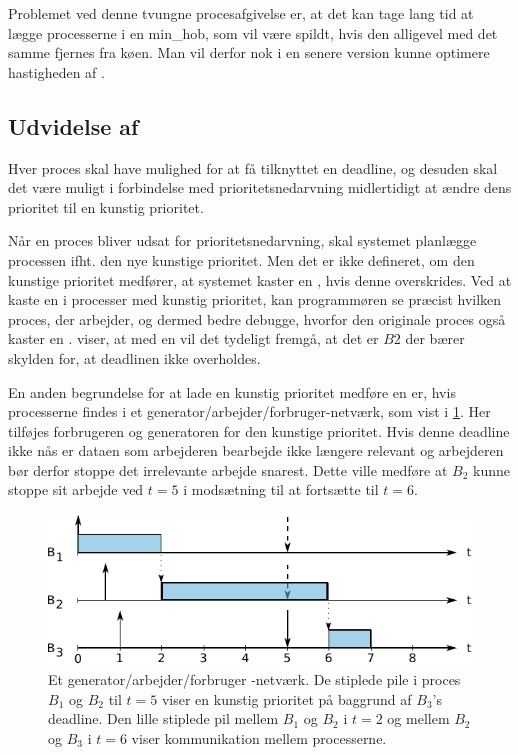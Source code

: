 Problemet ved denne tvungne procesafgivelse er, at det kan tage lang tid at lægge processerne i en min\_hob, som vil være spildt, hvis den alligevel med det samme fjernes fra køen. Man vil derfor nok i en senere version kunne optimere hastigheden af .

\subsection{Udvidelse af }
Hver proces skal have mulighed for at få tilknyttet en deadline, og desuden skal det være muligt i forbindelse med prioritetsnedarvning midlertidigt at ændre dens prioritet til en kunstig prioritet.

Når en proces bliver udsat for prioritetsnedarvning, skal systemet planlægge processen ifht. den nye kunstige prioritet. Men det er ikke defineret, om den kunstige prioritet medfører, at systemet kaster en  ,  hvis  denne overskrides. Ved at kaste en  i processer med kunstig prioritet, kan programmøren se præcist hvilken proces, der arbejder, og dermed bedre debugge, hvorfor den originale proces også kaster en .  viser, at med en  vil det tydeligt fremgå, at det er $B2$ der bærer skylden for, at deadlinen ikke overholdes.

En anden begrundelse for at lade en kunstig prioritet medføre en  er, hvis processerne findes i et generator/arbejder/forbruger-netværk, som vist i \cref{fig:producer-worker-consumer}. Her tilføjes forbrugeren og generatoren for den kunstige prioritet. Hvis denne deadline ikke nås er dataen som arbejderen bearbejde ikke længere relevant og arbejderen bør derfor stoppe det irrelevante arbejde snarest. Dette ville medføre at $B_2$ kunne stoppe sit arbejde ved $t = 5$ i modsætning til at fortsætte til $t = 6$.



\begin{figure}
 \begin{center}
  \includegraphics[scale=1.00]{images/producer-worker-consumer}
  \caption{Et generator/arbejder/forbruger -netværk. De stiplede pile i proces $B_1$ og $B_2$ til $t=5$ viser en kunstig prioritet på baggrund af $B_3$'s deadline. Den lille stiplede pil mellem  $B_1$ og $B_2$ i $t=2$ og mellem $B_2$ og $B_3$ i $t=6$ viser kommunikation mellem processerne.}
  \label{fig:producer-worker-consumer}
  \end{center}
\end{figure}

